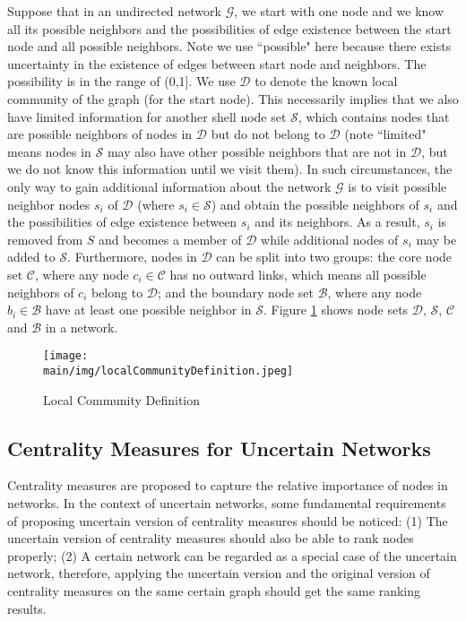 \documentclass[\main/thesis.tex]{subfiles}
\begin{document}
Suppose that in an undirected network $\mathcal{G}$, we start with one node and we know all its possible neighbors and the possibilities of edge existence between the start node and all possible neighbors. Note we use ``possible" here because there exists uncertainty in the existence of edges between start node and neighbors. The possibility is in the range of (0,1]. We use $\mathcal{D}$ to denote the known local community of the graph (for the start node). This necessarily implies that we also have limited information for another shell node set $\mathcal{S}$, which contains nodes that are possible neighbors of nodes in $\mathcal{D}$ but do not belong to $\mathcal{D}$ (note ``limited" means nodes in $\mathcal{S}$ may also have other possible neighbors that are not in $\mathcal{D}$, but we do not know this information until we visit them). In such circumstances, the only way to gain additional information about the network $\mathcal{G}$ is to visit possible neighbor nodes $s_i$ of $\mathcal{D}$ (where $s_i\in \mathcal{S}$) and obtain the possible neighbors of $s_i$ and the possibilities of edge existence between $s_i$ and its neighbors. As a result, $s_i$ is removed from $S$ and becomes a member of $\mathcal{D}$ while additional nodes of $s_i$ may be added to $\mathcal{S}$. Furthermore, nodes in $\mathcal{D}$ can be split into two groups: the core node set $\mathcal{C}$, where any node $c_i\in \mathcal{C}$ has no outward links, which means all possible neighbors of $c_i$ belong to $\mathcal{D}$; and the boundary node set $\mathcal{B}$, where any node $b_i\in \mathcal{B}$ have at least one possible neighbor in $\mathcal{S}$. Figure \ref{Local_Community_Definition} shows node sets $\mathcal{D}$, $\mathcal{S}$, $\mathcal{C}$ and $\mathcal{B}$ in a network.

\begin{figure}
\centering
\texttt{[image: \\main/img/localCommunityDefinition.jpeg]}
\caption{Local Community Definition}
\label{Local_Community_Definition}
\end{figure}

\subsection{Centrality Measures for Uncertain Networks}
Centrality measures are proposed to capture the relative importance of nodes in networks. In the context of uncertain networks, some fundamental requirements of proposing uncertain version of centrality measures should be noticed: (1) The uncertain version of centrality measures should also be able to rank nodes properly; (2) A certain network can be regarded as a special case of the uncertain network, therefore, applying the uncertain version and the original version of centrality measures on the same certain graph should get the same ranking results.
\end{document}
